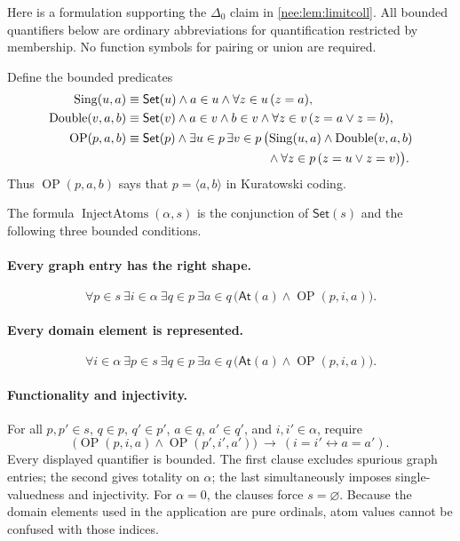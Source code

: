 \documentclass[11pt,letterpaper]{article}
\numberwithin{equation}{section}
\theoremstyle{plain}
\theoremstyle{definition}
\theoremstyle{remark}
\newcommand{\At}{\mathsf{At}}
\newcommand{\Set}{\mathsf{Set}}
\begin{document}
Here is a formulation supporting the $\Delta_0$ claim in \cref{nee:lem:limitcoll}. All bounded quantifiers below are ordinary abbreviations for quantification restricted by membership. No function symbols for pairing or union are required.

Define the bounded predicates
\begin{align*}
\operatorname{Sing}(u,a)&\equiv
\Set(u)\land a\in u\land\forall z\in u\,(z=a),\\
\operatorname{Double}(v,a,b)&\equiv
\Set(v)\land a\in v\land b\in v\land
\forall z\in v\,(z=a\lor z=b),\\
\operatorname{OP}(p,a,b)&\equiv
\Set(p)\land\exists u\in p\,\exists v\in p\,
\bigl(\operatorname{Sing}(u,a)\land\operatorname{Double}(v,a,b)\\
&\hspace{40mm}\land\forall z\in p\,(z=u\lor z=v)\bigr).
\end{align*}
Thus $\operatorname{OP}(p,a,b)$ says that $p=\langle a,b\rangle$ in Kuratowski coding.

The formula $\operatorname{InjectAtoms}(\alpha,s)$ is the conjunction of $\Set(s)$ and the following three bounded conditions.

\paragraph{Every graph entry has the right shape.}
\[
\forall p\in s\ \exists i\in\alpha\ \exists q\in p\ \exists a\in q\,
\bigl(\At(a)\land\operatorname{OP}(p,i,a)\bigr).
\]
\paragraph{Every domain element is represented.}
\[
\forall i\in\alpha\ \exists p\in s\ \exists q\in p\ \exists a\in q\,
\bigl(\At(a)\land\operatorname{OP}(p,i,a)\bigr).
\]
\paragraph{Functionality and injectivity.}
For all $p,p'\in s$, $q\in p$, $q'\in p'$, $a\in q$, $a'\in q'$, and $i,i'\in\alpha$, require
\[
\bigl(\operatorname{OP}(p,i,a)\land\operatorname{OP}(p',i',a')\bigr)
\ \longrightarrow\ (i=i'\leftrightarrow a=a').
\]
Every displayed quantifier is bounded. The first clause excludes spurious graph entries; the second gives totality on $\alpha$; the last simultaneously imposes single-valuedness and injectivity. For $\alpha=0$, the clauses force $s=\varnothing$. Because the domain elements used in the application are pure ordinals, atom values cannot be confused with those indices.
\end{document}
